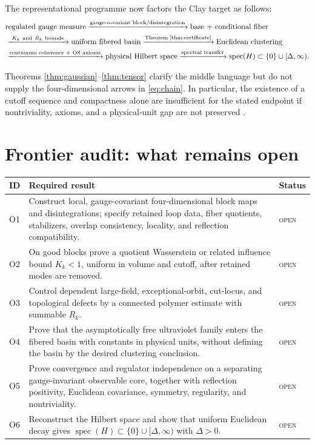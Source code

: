 \documentclass[11pt]{article}
\newcommand{\open}{\textcolor{openred}{\textsc{open}}}
\theoremstyle{remark}
\begin{document}
The representational programme now factors the Clay target as follows:
\begin{equation}\label{eq:chain}
\begin{split}
&\text{regulated gauge measure}
\xrightarrow{\text{gauge-covariant block/disintegration}}
\text{base + conditional fiber}\\
&\xrightarrow{\ K_k\ \text{and}\ R_k\ \text{bounds}\ }
\text{uniform fibered basin}
\xrightarrow{\text{Theorem \ref{thm:certificate}}}
\text{Euclidean clustering}\\
&\xrightarrow{\text{continuum coherence + OS axioms}}
\text{physical Hilbert space}
\xrightarrow{\text{spectral transfer}}
\operatorname{spec}(H)\subset\{0\}\cup[\Delta,\infty).
\end{split}
\end{equation}

Theorems \ref{thm:gaussian}--\ref{thm:tensor} clarify the middle language but
do not supply the four-dimensional arrows in \eqref{eq:chain}.  In particular,
the existence of a cutoff sequence and compactness alone are insufficient for
the stated endpoint if nontriviality, axioms, and a physical-unit gap are not
preserved \cite{jaffe-witten}.

\section{Frontier audit: what remains open}

\begin{longtable}{@{}p{}p{}p{}@{}}
\toprule
ID & Required result & Status\\
\midrule
\endhead
O1 & Construct local, gauge-covariant four-dimensional block maps and
disintegrations; specify retained loop data, fiber quotients, stabilizers,
overlap consistency, locality, and reflection compatibility. & \open\\
O2 & On good blocks prove a quotient Wasserstein or related influence bound
$K_k<1$, uniform in volume and cutoff, after retained modes are removed. & \open\\
O3 & Control dependent large-field, exceptional-orbit, cut-locus, and
topological defects by a connected polymer estimate with summable $R_k$. & \open\\
O4 & Prove that the asymptotically free ultraviolet family enters the fibered
basin with constants in physical units, without defining the basin by the
desired clustering conclusion. & \open\\
O5 & Prove convergence and regulator independence on a separating
gauge-invariant observable core, together with reflection positivity,
Euclidean covariance, symmetry, regularity, and nontriviality. & \open\\
O6 & Reconstruct the Hilbert space and show that uniform Euclidean decay gives
$\operatorname{spec}(H)\subset\{0\}\cup[\Delta,\infty)$ with $\Delta>0$. & \open\\
\bottomrule
\end{longtable}
\end{document}
